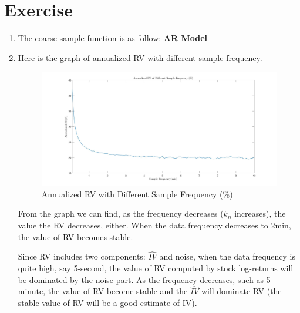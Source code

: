 \documentclass[12pt,letterpaper]{article}
\begin{document}
\section*{Exercise}
\begin{enumerate}[label=\textbf{(\Alph*)}]  	
  	
\item 
The coarse sample function is as follow:
\textbf{AR Model} 

\item Here is the graph of annualized RV with different sample frequency.
\begin{figure}[H]
	\centering
    \includegraphics[width=12cm]{figures/ex7_B.jpg}
	\caption{Annualized RV with Different Sample Frequency (\%)}
\end{figure}
From the graph we can find, as the frequency decreases ($k_n$ increases), the value the RV decreases, either. When the data frequency decreases to 2min, the value of RV becomes stable.

Since RV includes two components: $\hat{IV}$ and noise, when the data frequency is quite high, say 5-second, the value of RV computed by stock log-returns will be dominated by the noise part. As the frequency decreases, such as 5-minute, the value of RV become stable and the $\hat{IV}$ will dominate RV (the stable value of RV will be a good estimate of IV).


\end{enumerate}
\end{document}
